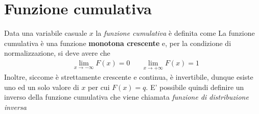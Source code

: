 \documentclass{report}
\begin{document}
\section{Funzione cumulativa}
Data una variabile casuale $x$ la \emph{funzione cumulativa} è definita come
\noindent La funzione cumulativa è una funzione \textbf{monotona crescente} e, per la condizione di normalizzazione, si deve avere che
\begin{align*}
	&\lim_{x \to -\infty} F(x) = 0 & &\lim_{x \to +\infty} F(x) = 1
\end{align*}
Inoltre, siccome è strettamente crescente e continua, è invertibile, dunque esiste uno ed un solo valore di $x$ per cui $F(x) = q$. E' possibile quindi definire un inverso della funzione cumulativa che viene chiamata \emph{funzione di distribuzione inversa}
\end{document}
